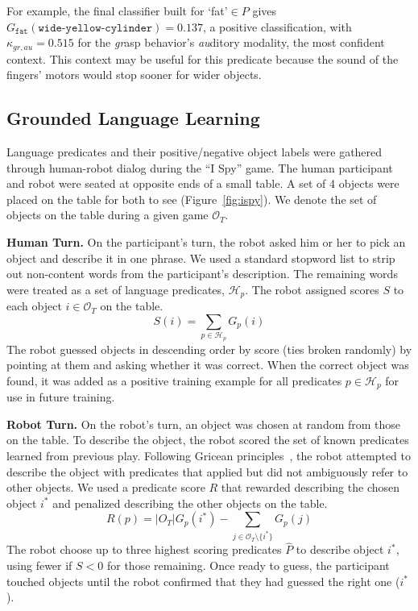 \documentclass{article}
\newcommand{\ispy}{``I Spy''\xspace}
\begin{document}
For example, the final classifier built for `fat'$\in P$ gives $G_{\texttt{fat}}(\texttt{wide-yellow-cylinder}) = 0.137$, a positive classification, with $\kappa_{gr,au}=0.515$ for the \textit{gr}asp behavior's \textit{au}ditory modality, the most confident context. This context may be useful for this predicate because the sound of the fingers' motors would stop sooner for wider objects.

	\subsection{Grounded Language Learning}
	\label{ssec:gll}
Language predicates and their positive/negative object labels were gathered through human-robot dialog during the \ispy game.
The human participant and robot were seated at opposite ends of a small table.
A set of 4 objects were placed on the table for both to see (Figure~\ref{fig:ispy}).
We denote the set of objects on the table during a given game $\mathcal{O}_T$.

\textbf{Human Turn.} On the participant's turn, the robot asked him or her to pick an object and describe it in one phrase.
We used a standard stopword list to strip out non-content words from the participant's description.
The remaining words were treated as a set of language predicates, $\mathcal{H}_p$.
The robot assigned scores $S$ to each object $i\in \mathcal{O}_T$ on the table.
\begin{equation}
	S(i) = \sum_{p\in \mathcal{H}_p}{G_p(i)}
\end{equation}
The robot guessed objects in descending order by score (ties broken randomly) by pointing at them and asking whether it was correct.
When the correct object was found, it was added as a positive training example for all predicates $p\in \mathcal{H}_p$ for use in future training.

\textbf{Robot Turn.} On the robot's turn, an object was chosen at random from those on the table.
To describe the object, the robot scored the set of known predicates learned from previous play.
Following Gricean principles~\cite{grice:bkchapter75}, the robot attempted to describe the object with predicates that applied but did not ambiguously refer to other objects.
We used a predicate score $R$ that rewarded describing the chosen object $i^*$ and penalized describing the other objects on the table.
\begin{equation}
	R(p) = |O_T|G_p(i^*) - \sum_{j\in{\mathcal{O}_T}\setminus\{i^*\}}{G_p(j)}
\end{equation}
The robot choose up to three highest scoring predicates $\hat{P}$ to describe object $i^*$, using fewer if $S<0$ for those remaining.
Once ready to guess, the participant touched objects until the robot confirmed that they had guessed the right one ($i^*$).
\end{document}
